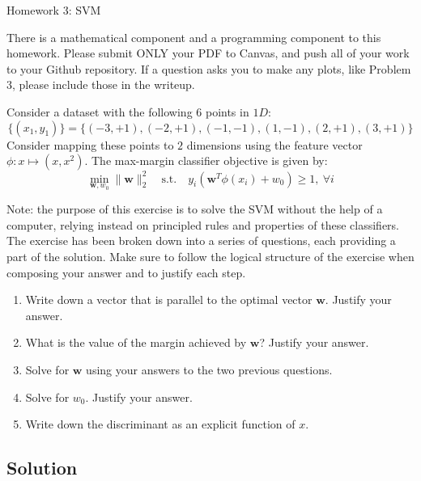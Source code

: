 \documentclass[submit]{harvardml}
\begin{document}
\begin{center}
{\Large Homework 3: SVM}\\
\end{center}

There is a mathematical component and a programming component to this homework.
Please submit ONLY your PDF to Canvas, and push all of your work to your Github
repository. If a question asks you to make any plots, like Problem 3, please
include those in the writeup.

\begin{problem}
Consider a dataset with the following 6 points in $1D$: \[\{(x_1, y_1)\} =\{(-3
, +1 ), (-2 , +1 ) , (-1,  -1 ), ( 1 , -1 ), ( 2 , +1 ), ( 3 , +1 )\}\] Consider
mapping these points to $2$ dimensions using the feature vector $\phi : x
\mapsto (x, x^2)$. The max-margin classifier objective is given by:
\begin{equation}
  \min_{\mathbf{w}, w_0} \|\mathbf{w}\|_2^2 \quad \text{s.t.} \quad y_i(\mathbf{w}^T \phi(x_i) +
  w_0) \geq 1,~\forall i
\end{equation}

Note: the purpose of this exercise is to solve the SVM without the help of a
computer, relying instead on principled rules and properties of these
classifiers. The exercise has been broken down into a series of questions, each
providing a part of the solution. Make sure to follow the logical structure of
the exercise when composing your answer and to justify each step.

\begin{enumerate}
  \item Write down a vector that is parallel to the optimal vector $\mathbf{w}$. Justify
    your answer.
  \item What is the value of the margin achieved by $\mathbf{w}$? Justify your
    answer.
  \item Solve for $\mathbf{w}$ using your answers to the two previous questions.
  \item Solve for $w_0$. Justify your answer.
  \item Write down the discriminant as an explicit function of $x$.
\end{enumerate}

\end{problem}
\subsection*{Solution}
\end{document}
